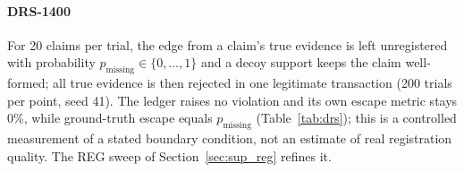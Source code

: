 \documentclass[journal]{IEEEtran}
\begin{document}
\begin{table}[!t]
\centering
\caption{RLV2-400 strict-validator challenge (50 trials per condition; seed 20260916).}
\label{tab:rlv2}
\end{table}

\paragraph{DRS-1400} For 20 claims per trial, the edge from a claim's true evidence is left unregistered with probability $p_{\text{missing}}\in\{0,\dots,1\}$ and a decoy support keeps the claim well-formed; all true evidence is then rejected in one legitimate transaction (200 trials per point, seed 41). The ledger raises no violation and its own escape metric stays 0\%, while ground-truth escape equals $p_{\text{missing}}$ (Table~\ref{tab:drs}); this is a controlled measurement of a stated boundary condition, not an estimate of real registration quality. The REG sweep of Section~\ref{sec:sup_reg} refines it.
\end{document}
